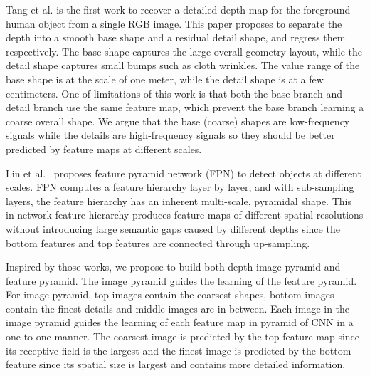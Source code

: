 \documentclass{article} %
\begin{document}
Tang et al.\cite{tang2019neural} is the first work to recover a detailed depth map for the foreground human object from a single RGB image. This paper proposes to separate the depth into a smooth base shape and a residual detail shape, and regress them respectively. The base shape captures the large overall geometry layout, while the detail shape captures small bumps such as cloth wrinkles. The value range of the base shape is at the scale of one meter, while the detail shape is at a few centimeters. One of limitations of this work is that both the base branch and detail branch use the same feature map, which prevent the base branch learning a coarse overall shape. We argue that the base (coarse) shapes are low-frequency signals while the details are high-frequency signals so they should be better predicted by feature maps at different scales.

Lin et al.~\cite{lin2017feature} proposes feature pyramid network (FPN) to detect objects at different scales. FPN computes a feature hierarchy layer by layer, and with sub-sampling layers, the feature hierarchy has an inherent multi-scale, pyramidal shape. This in-network feature hierarchy produces feature maps of different spatial resolutions without introducing large semantic gaps caused by different depths since the bottom features and top features are connected through up-sampling.

Inspired by those works, we propose to build both depth image pyramid and feature pyramid. The image pyramid guides the learning of the feature pyramid. For image pyramid, top images contain the coarsest shapes, bottom images contain the finest details and middle images are in between. Each image in the image pyramid guides the learning of each feature map in pyramid of CNN in a one-to-one manner. The coarsest image is predicted by the top feature map since its receptive field is the largest and the finest image is predicted by the bottom feature since its spatial size is largest and contains more detailed information.




\end{document}
